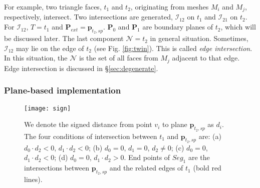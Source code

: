 For example, two triangle faces, $t_1$ and $t_2$, originating from meshes $M_i$ and $M_j$, respectively, intersect. Two intersections are generated, ${\bm{\mathcal{I}}}_{12}$ on $t_1$ and ${\bm{\mathcal{I}}}_{21}$ on $t_2$.
For ${\bm{\mathcal{I}}}_{12}$, $T = t_1$ and $\bm{P}_{ext}=\bm{p}_{t_2, sp}$. $\bm{P}_0$ and $\bm{P}_1$ are boundary planes of $t_2$, which will be discussed later.
The last component $\mathcal{N}=t_2$ in general situation. Sometimes, ${\bm{\mathcal{I}}}_{12}$ may lie on the edge of $t_2$ (see Fig. \ref{fig:twin}). This is called \emph{edge intersection}. In this situation, the $\mathcal{N}$ is the set of all faces from $M_j$ adjacent to that edge. Edge intersection is discussed in \S\ref{sec:degenerate}.


\subsubsection{Plane-based implementation}

\label{sec:embed}

\begin{figure}[t]
\centering
\texttt{[image: sign]}
\caption{We denote the signed distance from point $v_i$ to plane $\bm{p}_{t_2, sp}$ as $d_i$. The four conditions of intersection between $t_1$ and $\bm{p}_{t_2, sp}$ are:
(a) $d_0\cdot d_2<0$, $d_1\cdot d_2<0$;
(b) $d_0=0$, $d_1=0$, $d_2\neq 0$;
(c) $d_0=0$, $d_1\cdot d_2<0$;
(d) $d_0=0$, $d_1\cdot d_2>0$. End points of $Seg_1$ are the intersections between $\bm{p}_{t_2, sp}$ and the related edges of $t_1$ (bold red lines).}
\label{fig:isect}
\end{figure}

